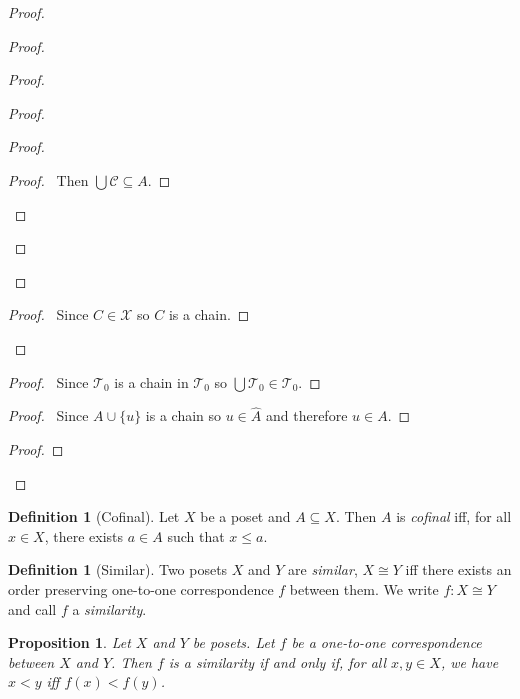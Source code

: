 \documentclass{report}
\let\qed\relax
\newtheorem{prop}[ax]{Proposition}
\theoremstyle{definition}
\newtheorem{df}[ax]{Definition}
\begin{document}
\begin{proof}
\begin{proof}
\begin{proof}
\begin{proof}
\begin{proof}
				\begin{proof}
					\pf\ Then $\bigcup \mathcal{C} \subseteq A$.
				\end{proof}
			\end{proof}
		\end{proof}
	\end{proof}
	\begin{proof}
		\pf\ Since $C \in \mathcal{X}$ so $C$ is a chain.
	\end{proof}
\end{proof}
\begin{proof}
	\pf\ Since $\mathcal{T}_0$ is a chain in $\mathcal{T}_0$ so $\bigcup \mathcal{T}_0 \in \mathcal{T}_0$.
\end{proof}
\begin{proof}
	\pf\ Since $A \cup \{u\}$ is a chain so $u \in \hat{A}$ and therefore $u \in A$.
\end{proof}
\begin{proof}
\end{proof}
\qed
\end{proof}

\begin{df}[Cofinal]
Let $X$ be a poset and $A \subseteq X$. Then $A$ is \emph{cofinal} iff, for all $x \in X$, there exists $a \in A$ such that $x \leq a$.
\end{df}

\begin{df}[Similar]
Two posets $X$ and $Y$ are \emph{similar}, $X \cong Y$ iff there exists an order preserving one-to-one correspondence $f$ between them. We write $f : X \cong Y$ and call $f$ a \emph{similarity}.
\end{df}

\begin{prop}
Let $X$ and $Y$ be posets. Let $f$ be a one-to-one correspondence between $X$ and $Y$. Then $f$ is a similarity if and only if, for all $x,y \in X$, we have $x < y$ iff $f(x) < f(y)$.
\end{prop}
\end{document}
